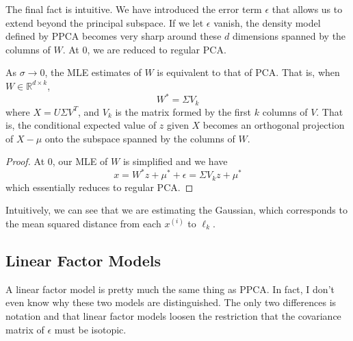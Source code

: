   The final fact is intuitive. We have introduced the error term $\epsilon$ that allows us to extend beyond the principal subspace. If we let $\epsilon$ vanish, the density model defined by PPCA becomes very sharp around these $d$ dimensions spanned by the columns of $W$. At $0$, we are reduced to regular PCA. 

  \begin{theorem} 
    As $\sigma \rightarrow 0$, the MLE estimates of $W$ is equivalent to that of PCA. That is, when $W \in \mathbb{R}^{d \times k}$, 
    \begin{equation}
      W^\ast = \Sigma V_k
    \end{equation} 
    where $X = U \Sigma V^T$, and $V_k$ is the matrix formed by the first $k$ columns of $V$. That is, the conditional expected value of $z$ given $X$ becomes an orthogonal projection of $X - \mu$ onto the subspace spanned by the columns of $W$. 
  \end{theorem}
  \begin{proof}
    At $0$, our MLE of $W$ is simplified and we have 
    \begin{equation}
      x = W^\ast z + \mu^\ast + \epsilon = \Sigma V_k z + \mu^\ast
    \end{equation}
    which essentially reduces to regular PCA. 
  \end{proof}

  Intuitively, we can see that we are estimating the Gaussian, which corresponds to the mean squared distance from each $x^{(i)}$ to $\ell_k$. 

\subsection{Linear Factor Models} 

  A linear factor model is pretty much the same thing as PPCA. In fact, I don't even know why these two models are distinguished. The only two differences is notation and that linear factor models loosen the restriction that the covariance matrix of $\epsilon$ must be isotopic. 


